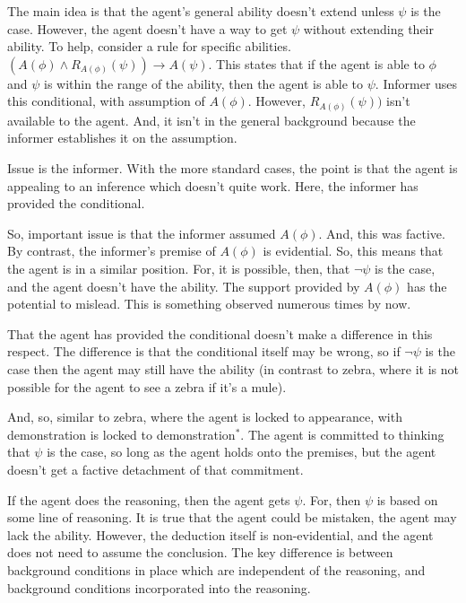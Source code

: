 \documentclass[10pt]{article}
\begin{document}
\begin{note}
  {
    \color{red}
    The main idea is that the agent's general ability doesn't extend unless \(\psi\) is the case.
    However, the agent doesn't have a way to get \(\psi\) without extending their ability.
  }
  To help, consider a rule for specific abilities.
  \((A(\phi) \land R_{A(\phi)}(\psi)) \rightarrow A(\psi)\).
  This states that if the agent is able to \(\phi\) and \(\psi\) is within the range of the ability, then the agent is able to \(\psi\).
  Informer uses this conditional, with assumption of \(A(\phi)\).
  However, \(R_{A(\phi)}(\psi))\) isn't available to the agent.
  And, it isn't in the general background because the informer establishes it on the assumption.

  Issue is the informer.
  With the more standard cases, the point is that the agent is appealing to an inference which doesn't quite work.
  Here, the informer has provided the conditional.

  So, important issue is that the informer assumed \(A(\phi)\).
  And, this was factive.
  By contrast, the informer's premise of \(A(\phi)\) is evidential.
  So, this means that the agent is in a similar position.
  For, it is possible, then, that \(\lnot\psi\) is the case, and the agent doesn't have the ability.
  The support provided by \(A(\phi)\) has the potential to mislead.
  This is something observed numerous times by now.

  That the agent has provided the conditional doesn't make a difference in this respect.
  The difference is that the conditional itself may be wrong, so if \(\lnot\psi\) is the case then the agent may still have the ability (in contrast to zebra, where it is not possible for the agent to see a zebra if it's a mule).

  And, so, similar to zebra, where the agent is locked to appearance, with demonstration is locked to demonstration\(^{*}\).
  The agent is committed to thinking that \(\psi\) is the case, so long as the agent holds onto the premises, but the agent doesn't get a factive detachment of that commitment.

  If the agent does the reasoning, then the agent gets \(\psi\).
  For, then \(\psi\) is based on some line of reasoning.
  It is true that the agent could be mistaken, the agent may lack the ability.
  However, the deduction itself is non-evidential, and the agent does not need to assume the conclusion.
  The key difference is between background conditions in place which are independent of the reasoning, and background conditions incorporated into the reasoning.


\end{note}
\end{document}
